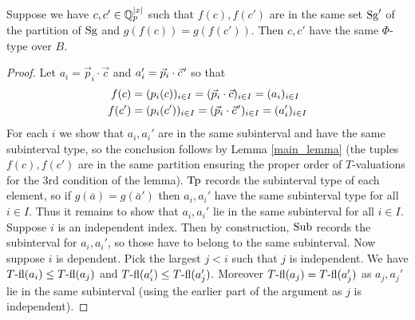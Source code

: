\documentclass{amsart}
\begin{document}
\begin{Lemma}
  Suppose we have $c, c' \in \mathbb{Q}_p^{|x|}$ such that $f(c), f(c')$ are in the same
  set $\operatorname{Sg}'$ of the partition of $\operatorname{Sg}$ and $g(f(c)) = g(f(c'))$.
  Then $c, c'$ have the same $\Phi$-type over $B$.
\end{Lemma}

\newcommand{\pvec}[1]{\vec{#1}\mkern2mu\vphantom{#1}}

\begin{proof}
  Let $a_i = \vec p_i \cdot \vec c$ and $a_i' = \vec p_i \cdot \pvec c'$ so that
  \begin{align*}
    f(c) &= (p_i(c))_{i \in I} = (\vec p_i \cdot \vec c)_{i \in I} = (a_i)_{i \in I} \\
    f(c') &= (p_i(c'))_{i \in I} = (\vec p_i \cdot \pvec c')_{i \in I} = (a_i')_{i \in I}
  \end{align*}
  For each $i$ we show that $a_i, a_i'$ are in the same subinterval and have the same subinterval type,
  so the conclusion follows by Lemma \ref{main_lemma}
  (the tuples $f(c), f(c')$ are in the same partition ensuring the proper order of $T$-valuations for the 3rd condition of the lemma).
  $\operatorname{Tp}$ records the subinterval type of each element, so if $g(\bar a) = g(\bar a')$ then $a_i, a_i'$ have the same subinterval type for all $i \in I$.
  Thus it remains to show that $a_i, a_i'$ lie in the same subinterval for all $i \in I$.
  Suppose $i$ is an independent index.
  Then by construction, $\operatorname{Sub}$ records the subinterval for $a_i, a_i'$, so those have to belong to the same subinterval.
  Now suppose $i$ is dependent.
  Pick the largest $j < i$ such that $j$ is independent.
  We have $T{\operatorname{-fl}}(a_i) \leq T{\operatorname{-fl}}(a_j)$ and $T{\operatorname{-fl}}(a_i') \leq T{\operatorname{-fl}}(a_j')$.
  Moreover $T{\operatorname{-fl}}(a_j) = T{\operatorname{-fl}}(a_j')$ as $a_j, a_j'$ lie in the same subinterval (using the earlier part of the argument as $j$ is independent).
  

\end{proof}
\end{document}
